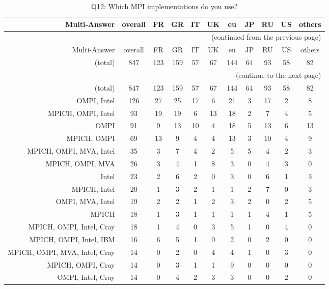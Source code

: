 \clearpage%
{\footnotesize\begin{landscape}%
\begin{longtable}[htb]{r|c|c|c|c|c|c|c|c|c|c}%
\caption{Q12: Which MPI implementations do you use?}%
\label{tab:Q12-mans} \\%
\hline%
Multi-Answer & overall & FR & GR & IT & UK & eu & JP & RU & US & others \\
 \hline%
\endfirsthead%
\multicolumn{11}{r}{(continued from the previous page)}\\%
\hline%
Multi-Answer & overall & FR & GR & IT & UK & eu & JP & RU & US & others \\
 \hline%
\endhead%
\hline%
(total) & 847 & 123 & 159 & 57 & 67 & 144 & 64 & 93 & 58 & 82 \\%
\hline%
\multicolumn{11}{r}{(continue to the next page)}\\%
\endfoot%
\hline%
(total) & 847 & 123 & 159 & 57 & 67 & 144 & 64 & 93 & 58 & 82 \\%
\hline%
\endlastfoot%
\hline%
{OMPI, Intel} & 126 & 27 & 25 & 17 & 6 & 21 & 3 & 17 & 2 & 8 \\%
{MPICH, OMPI, Intel} & 93 & 19 & 19 & 6 & 13 & 18 & 2 & 7 & 4 & 5 \\%
{OMPI} & 91 & 9 & 13 & 10 & 4 & 18 & 5 & 13 & 6 & 13 \\%
{MPICH, OMPI} & 69 & 13 & 9 & 4 & 4 & 13 & 3 & 10 & 4 & 9 \\%
{MPICH, OMPI, MVA, Intel} & 35 & 3 & 7 & 4 & 2 & 5 & 5 & 4 & 2 & 3 \\%
{MPICH, OMPI, MVA} & 26 & 3 & 4 & 1 & 8 & 3 & 0 & 4 & 3 & 0 \\%
{Intel} & 23 & 2 & 6 & 2 & 0 & 3 & 0 & 6 & 1 & 3 \\%
{MPICH, Intel} & 20 & 1 & 3 & 2 & 1 & 1 & 2 & 7 & 0 & 3 \\%
{OMPI, MVA, Intel} & 19 & 2 & 2 & 1 & 2 & 3 & 2 & 0 & 2 & 5 \\%
{MPICH} & 18 & 1 & 3 & 1 & 1 & 1 & 1 & 4 & 1 & 5 \\%
{MPICH, OMPI, Intel, Cray} & 18 & 1 & 4 & 0 & 3 & 5 & 1 & 0 & 4 & 0 \\%
{MPICH, OMPI, Intel, IBM} & 16 & 6 & 5 & 1 & 0 & 2 & 0 & 2 & 0 & 0 \\%
{MPICH, OMPI, MVA, Intel, Cray} & 14 & 0 & 2 & 0 & 4 & 4 & 1 & 0 & 3 & 0 \\%
{MPICH, OMPI, Cray} & 14 & 0 & 3 & 1 & 1 & 9 & 0 & 0 & 0 & 0 \\%
{OMPI, Intel, Cray} & 14 & 0 & 4 & 2 & 3 & 3 & 0 & 0 & 2 & 0 \\%

\end{longtable}
\end{landscape}}
